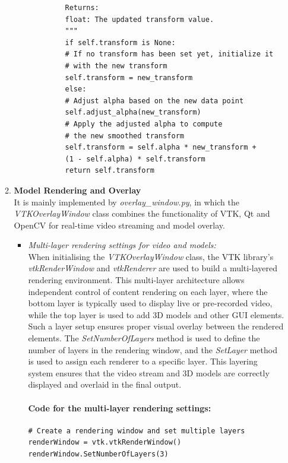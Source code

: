 \documentclass[12pt]{article}
\begin{document}
\begin{enumerate}
\begin{enumerate}
\begin{verbatim}
            Returns:
            float: The updated transform value.
            """
            if self.transform is None:
            # If no transform has been set yet, initialize it 
            # with the new transform
            self.transform = new_transform
            else:
            # Adjust alpha based on the new data point
            self.adjust_alpha(new_transform)
            # Apply the adjusted alpha to compute 
            # the new smoothed transform
            self.transform = self.alpha * new_transform + 
            (1 - self.alpha) * self.transform
            return self.transform
                              \end{verbatim}
                  \item \textbf{Model Rendering and Overlay}
                        \\
                        It is mainly implemented by \emph{overlay\_window.py}, in which the \emph{VTKOverlayWindow} class combines the functionality of VTK, Qt and OpenCV for real-time video streaming and model overlay.
                        \begin{itemize}
                              \item \textit{Multi-layer rendering settings for video and models:}
                                    \\
                                    When initialising the \emph{VTKOverlayWindow} class, the VTK library's \emph{vtkRenderWindow} and \emph{vtkRenderer} are used to build a multi-layered rendering environment\cite{7783818}. This multi-layer architecture allows independent control of content rendering on each layer, where the bottom layer is typically used to display live or pre-recorded video, while the top layer is used to add 3D models and other GUI elements\cite{5974642,6194820}. Such a layer setup ensures proper visual overlay between the rendered elements. The \emph{SetNumberOfLayers} method is used to define the number of layers in the rendering window, and the \emph{SetLayer} method is used to assign each renderer to a specific layer. This layering system ensures that the video stream and 3D models are correctly displayed and overlaid in the final output\cite{7783818}.
                                    \paragraph{Code for the multi-layer rendering settings:}
                                    \begin{verbatim}
# Create a rendering window and set multiple layers
renderWindow = vtk.vtkRenderWindow()
renderWindow.SetNumberOfLayers(3)


\end{verbatim}
\end{itemize}
\end{enumerate}
\end{enumerate}
\end{document}
